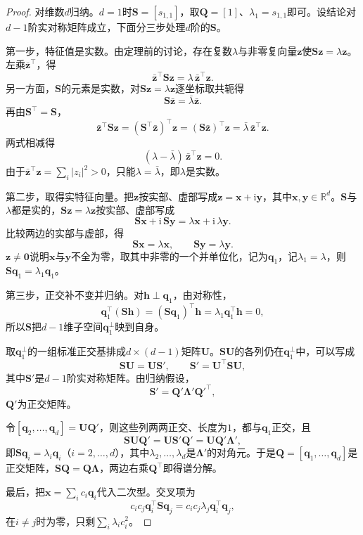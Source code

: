 \begin{proof}
对维数$d$归纳。$d=1$时$\bm S=[s_{1,1}]$，取$\bm Q=[1]$、$\lambda_1=s_{1,1}$即可。设结论对$d-1$阶实对称矩阵成立，下面分三步处理$d$阶的$\bm S$。

第一步，特征值是实数。由定理前的讨论，存在复数$\lambda$与非零复向量$\bm z$使$\bm S\bm z=\lambda\bm z$。左乘$\bar{\bm z}^\top$，得
\[
 \bar{\bm z}^\top\bm S\bm z=\lambda\,\bar{\bm z}^\top\bm z .
\]
另一方面，$\bm S$的元素是实数，对$\bm S\bm z=\lambda\bm z$逐坐标取共轭得
\[
 \bm S\bar{\bm z}=\bar\lambda\bar{\bm z} .
\]
再由$\bm S^\top=\bm S$，
\[
 \bar{\bm z}^\top\bm S\bm z=(\bm S^\top\bar{\bm z})^\top\bm z=(\bm S\bar{\bm z})^\top\bm z=\bar\lambda\,\bar{\bm z}^\top\bm z .
\]
两式相减得
\[
 (\lambda-\bar\lambda)\,\bar{\bm z}^\top\bm z=0 .
\]
由于$\bar{\bm z}^\top\bm z=\sum_i|z_i|^2>0$，只能$\lambda=\bar\lambda$，即$\lambda$是实数。

第二步，取得实特征向量。把$\bm z$按实部、虚部写成$\bm z=\bm x+\mathrm i\bm y$，其中$\bm x,\bm y\in\mathbb R^d$。$\bm S$与$\lambda$都是实的，$\bm S\bm z=\lambda\bm z$按实部、虚部写成
\[
 \bm S\bm x+\mathrm i\,\bm S\bm y=\lambda\bm x+\mathrm i\,\lambda\bm y .
\]
比较两边的实部与虚部，得
\[
 \bm S\bm x=\lambda\bm x,\qquad\bm S\bm y=\lambda\bm y .
\]
$\bm z\neq\bm0$说明$\bm x$与$\bm y$不全为零，取其中非零的一个并单位化，记为$\bm q_1$，记$\lambda_1=\lambda$，则$\bm S\bm q_1=\lambda_1\bm q_1$。

第三步，正交补不变并归纳。对$\bm h\perp\bm q_1$，由对称性，
\[
 \bm q_1^\top(\bm S\bm h)=(\bm S\bm q_1)^\top\bm h=\lambda_1\bm q_1^\top\bm h=0 ,
\]
所以$\bm S$把$d-1$维子空间$\bm q_1^\perp$映到自身。

取$\bm q_1^\perp$的一组标准正交基排成$d\times(d-1)$矩阵$\bm U$。$\bm S\bm U$的各列仍在$\bm q_1^\perp$中，可以写成
\[
 \bm S\bm U=\bm U\bm S',\qquad\bm S'=\bm U^\top\bm S\bm U,
\]
其中$\bm S'$是$d-1$阶实对称矩阵。由归纳假设，
\[
 \bm S'=\bm Q'\bm\Lambda'\bm Q'^\top,
\]
$\bm Q'$为正交矩阵。

令$[\bm q_2,\ldots,\bm q_d]=\bm U\bm Q'$，则这些列两两正交、长度为$1$，都与$\bm q_1$正交，且
\[
 \bm S\bm U\bm Q'=\bm U\bm S'\bm Q'=\bm U\bm Q'\bm\Lambda',
\]
即$\bm S\bm q_i=\lambda_i\bm q_i$（$i=2,\ldots,d$），其中$\lambda_2,\ldots,\lambda_d$是$\bm\Lambda'$的对角元。于是$\bm Q=[\bm q_1,\ldots,\bm q_d]$是正交矩阵，$\bm S\bm Q=\bm Q\bm\Lambda$，两边右乘$\bm Q^\top$即得谱分解。

最后，把$\bm x=\sum_ic_i\bm q_i$代入二次型。交叉项为
\[
 c_ic_j\bm q_i^\top\bm S\bm q_j=c_ic_j\lambda_j\bm q_i^\top\bm q_j ,
\]
在$i\neq j$时为零，只剩$\sum_i\lambda_ic_i^2$。
\end{proof}

